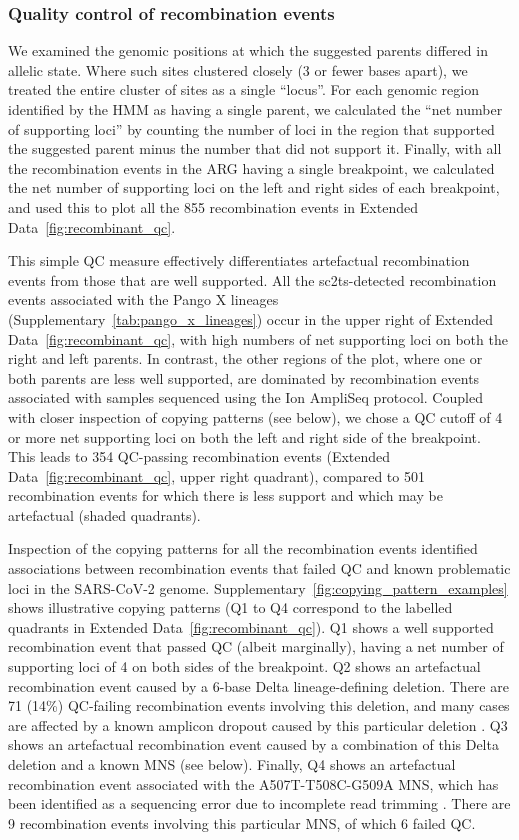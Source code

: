 \documentclass[12pt]{article}
\newcommand{\edref}[1]{Extended Data~\ref{#1}}
\newcommand{\siref}[1]{Supplementary~\ref{#1}}
\begin{document}
\subsubsection*{Quality control of recombination events}

We examined the genomic positions
at which the suggested parents differed in allelic state.
Where such sites clustered closely (3 or fewer bases apart),
we treated the entire cluster of sites as a single ``locus''.
For each genomic region identified by the HMM as having a single parent,
we calculated the ``net number of supporting loci''
by counting the number of loci in the region
that supported the suggested parent minus the number that did not support it.
Finally, with all the recombination events in the ARG having a single breakpoint,
we calculated the net number of supporting loci
on the left and right sides of each breakpoint, and
used this to plot all the 855 recombination events in \edref{fig:recombinant_qc}.

This simple QC measure effectively differentiates
artefactual recombination events from those that are well supported.
All the sc2ts-detected recombination events
associated with the Pango X lineages (\siref{tab:pango_x_lineages})
occur in the upper right of \edref{fig:recombinant_qc},
with high numbers of net supporting loci on both the right and left parents.
In contrast, the other regions of the plot,
where one or both parents are less well supported,
are dominated by recombination events associated with
samples sequenced using the Ion AmpliSeq protocol.
Coupled with closer inspection of copying patterns (see below),
we chose a QC cutoff of 4 or more net supporting loci
on both the left and right side of the breakpoint.
This leads to 354 QC-passing recombination events
(\edref{fig:recombinant_qc}, upper right quadrant),
compared to 501 recombination events
for which there is less support and which may be artefactual (shaded quadrants).

Inspection of the copying patterns for all the recombination events
identified associations between recombination events that failed QC and
known problematic loci in the SARS-CoV-2 genome.
\siref{fig:copying_pattern_examples} shows illustrative copying patterns
(Q1 to Q4 correspond to the labelled quadrants in \edref{fig:recombinant_qc}).
Q1 shows a well supported recombination event that passed QC (albeit marginally),
having a net number of supporting loci of 4 on both sides of the breakpoint.
Q2 shows an artefactual recombination event
caused by a 6-base Delta lineage-defining deletion.
There are 71 (14\%) QC-failing recombination events involving this deletion, and
many cases are affected by a known amplicon dropout
caused by this particular deletion \cite{Sanderson2021}.
Q3 shows an artefactual recombination event caused by
a combination of this Delta deletion and a known MNS (see below).
Finally, Q4 shows an artefactual recombination event
associated with the A507T-T508C-G509A MNS,
which has been identified as a sequencing error
due to incomplete read trimming \cite{DeMaio2024}.
There are 9 recombination events involving this particular MNS,
of which 6 failed QC.
\end{document}
